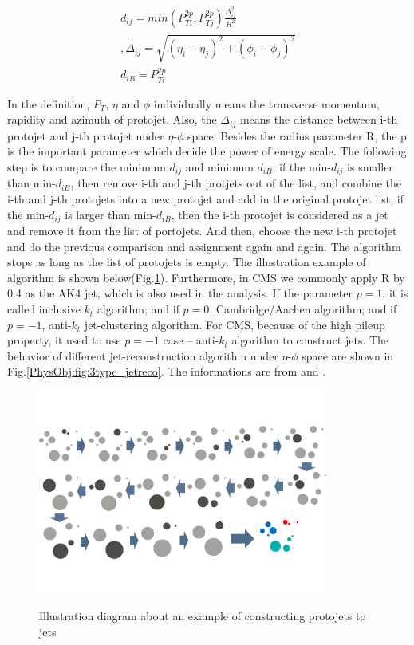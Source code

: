 		\begin{equation}
		\begin{split}
		d_{ij} = min(P_{Ti}^{2p}, P_{Tj}^{2p}) \frac{\Delta_{ij}^2}{R^2}\\
		, \Delta_{ij} = \sqrt{ (\eta_i - \eta_j)^2 + (\phi_i - \phi_j)^2 }\\
		d_{iB} = P_{Ti}^{2p}
		\end{split}
		\label{eq:jet_reco_algo}
		\end{equation}
		\FloatBarrier

		In the definition, $P_{T}$, $\eta$ and $\phi$ individually means the transverse momentum, rapidity and azimuth of protojet. Also, the $\Delta_{ij}$ means the distance between i-th protojet and j-th protojet under $\eta$-$\phi$ space. Besides the radius parameter R, the p is the important parameter which decide the power of energy scale. The following step is to compare the minimum $d_{ij}$ and minimum $d_{iB}$, if the min-$d_{ij}$ is smaller than min-$d_{iB}$, then remove i-th and j-th protjets out of the list, and combine the i-th and j-th protojets into a new protojet and add in the original protojet list; if the min-$d_{ij}$ is larger than min-$d_{iB}$, then the i-th protojet is considered as a jet and remove it from the list of portojets. And then, choose the new i-th protojet and do the previous comparison and assignment again and again. The algorithm stops as long as the list of protojets is empty. The illustration example of algorithm is shown below(Fig.\ref{PhysObj:fig:jet_algo}). Furthermore, in CMS we commonly apply R by 0.4 as the AK4 jet, which is also used in the analysis. If the parameter $p=1$, it is called inclusive $k_{t}$ algorithm; and if $p=0$, Cambridge/Aachen algorithm; and if $p=-1$, anti-$k_{t}$ jet-clustering algorithm. For CMS, because of the high pileup property, it used to use $p=-1$ case -- anti-$k_{t}$ algorithm to construct jets. The behavior of different jet-reconstruction algorithm under $\eta$-$\phi$ space are shown in Fig.\ref{PhysObj:fig:3type_jetreco}. The informations are from \cite{Atkin_2015} and \cite{Cacciari_2008}.

		\begin{figure}[H]
		\centering{}
	    	\includegraphics[width=0.85\textwidth]{Figures/PhysObj/jet_algo.pdf}\\
		\caption{Illustration diagram about an example of constructing protojets to jets}
		\label{PhysObj:fig:jet_algo}
		\end{figure}
		\FloatBarrier

